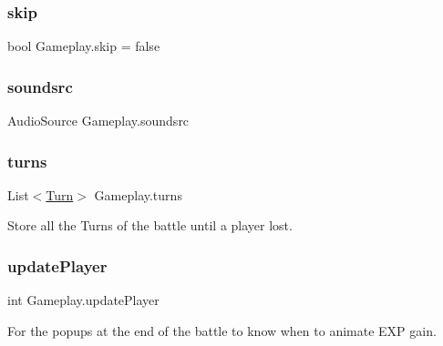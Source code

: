 \mbox{\label{class_gameplay_a9218bbfcfe0c3e6392eef67514aa18eb}} 
\subsubsection{\texorpdfstring{skip}{skip}}
{\footnotesize\ttfamily bool Gameplay.\+skip = false\hspace{0.3cm}{\ttfamily [private]}}

\mbox{\label{class_gameplay_a8d3cada851038cf7cd7a3b3f25b400bb}} 
\subsubsection{\texorpdfstring{soundsrc}{soundsrc}}
{\footnotesize\ttfamily Audio\+Source Gameplay.\+soundsrc}

\mbox{\label{class_gameplay_a835615e1b6b33c0340b1a6a00aff92ef}} 
\subsubsection{\texorpdfstring{turns}{turns}}
{\footnotesize\ttfamily List$<$\mbox{\hyperlink{class_turn}{Turn}}$>$ Gameplay.\+turns\hspace{0.3cm}{\ttfamily [private]}}



Store all the Turns of the battle until a player lost. 

\mbox{\label{class_gameplay_acd7f7caba8d780232371c187cdf8fcc8}} 
\subsubsection{\texorpdfstring{updatePlayer}{updatePlayer}}
{\footnotesize\ttfamily int Gameplay.\+update\+Player\hspace{0.3cm}{\ttfamily [static]}}



For the popups at the end of the battle to know when to animate E\+XP gain. 


